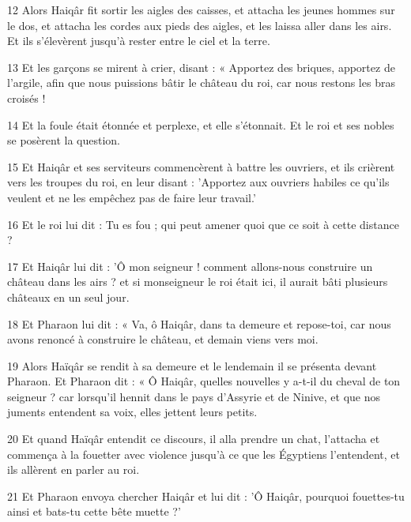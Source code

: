 \par 12 Alors Haiqâr fit sortir les aigles des caisses, et attacha les jeunes hommes sur le dos, et attacha les cordes aux pieds des aigles, et les laissa aller dans les airs. Et ils s’élevèrent jusqu’à rester entre le ciel et la terre.

\par 13 Et les garçons se mirent à crier, disant : « Apportez des briques, apportez de l'argile, afin que nous puissions bâtir le château du roi, car nous restons les bras croisés !

\par 14 Et la foule était étonnée et perplexe, et elle s'étonnait. Et le roi et ses nobles se posèrent la question.

\par 15 Et Haiqâr et ses serviteurs commencèrent à battre les ouvriers, et ils crièrent vers les troupes du roi, en leur disant : 'Apportez aux ouvriers habiles ce qu'ils veulent et ne les empêchez pas de faire leur travail.'

\par 16 Et le roi lui dit : Tu es fou ; qui peut amener quoi que ce soit à cette distance ?

\par 17 Et Haiqâr lui dit : 'Ô mon seigneur ! comment allons-nous construire un château dans les airs ? et si monseigneur le roi était ici, il aurait bâti plusieurs châteaux en un seul jour.

\par 18 Et Pharaon lui dit : « Va, ô Haiqâr, dans ta demeure et repose-toi, car nous avons renoncé à construire le château, et demain viens vers moi.

\par 19 Alors Haïqâr se rendit à sa demeure et le lendemain il se présenta devant Pharaon. Et Pharaon dit : « Ô Haiqâr, quelles nouvelles y a-t-il du cheval de ton seigneur ? car lorsqu'il hennit dans le pays d'Assyrie et de Ninive, et que nos juments entendent sa voix, elles jettent leurs petits.

\par 20 Et quand Haïqâr entendit ce discours, il alla prendre un chat, l'attacha et commença à la fouetter avec violence jusqu'à ce que les Égyptiens l'entendent, et ils allèrent en parler au roi.

\par 21 Et Pharaon envoya chercher Haiqâr et lui dit : 'Ô Haiqâr, pourquoi fouettes-tu ainsi et bats-tu cette bête muette ?'

